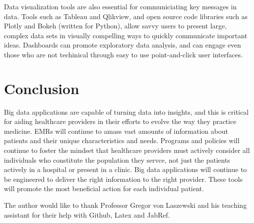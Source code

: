 \documentclass[sigconf]{acmart}
\begin{document}
 Data visualization tools are also essential for communiciating key messages in data. Tools such as Tableau and Qlikview, and open source code libraries such as Plotly and Bokeh (written for Python), allow savvy users to present large, complex data sets in visually compelling ways to quickly communicate important ideas. Dashboards can promote exploratory data analysis, and can engage even those who are not techinical through easy to use point-and-click user interfaces.
 
\section{Conclusion}

 Big data applications are capable of turning data into insights, and this is critical for aiding healthcare providers in their efforts to evolve the way they practice medicine. EMRs will continue to amass vast amounts of information about patients and their unique characteristics and needs. Programs and policies will continue to foster the mindset that healthcare providers must actively consider all individuals who constitute the population they servce, not just the patients actively in a hospital or present in a clinic. Big data applications will continue to be engineered to deliver the right information to the right provider. These tools will promote the most beneficial action for each individual patient.   

\begin{acks}

  The author would like to thank Professor Gregor von Laszewski and his teaching assistant for their help with Github, Latex and JabRef. 

\end{acks}


 
\end{document}
